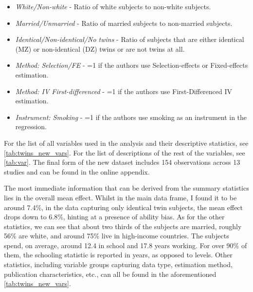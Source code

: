 \begin{itemize}
  \item \textit{White/Non-white} - Ratio of white subjects to non-white subjects.
  \item \textit{Married/Unmarried} - Ratio of married subjects to non-married subjects.
  \item \textit{Identical/Non-identical/No twins} - Ratio of subjects that are either identical (MZ) or non-identical (DZ) twins or are not twins at all.
  \item \textit{Method: Selection/FE} - =1 if the authors use  Selection-effects or Fixed-effects estimation.
  \item \textit{Method: IV First-differenced} - =1 if the authors use First-Differenced IV estimation.
  \item \textit{Instrument: Smoking} - =1 if the authors use smoking as an instrument in the regression.
\end{itemize}


For the list of all variables used in the analysis and their descriptive statistics, see \autoref{tab:twins_new_vars}. For the list of descriptions of the rest of the variables, see \autoref{tab:var}. The final form of the new dataset includes 154 observations across 13 studies and can be found in the online appendix.

The most immediate information that can be derived from the summary statistics lies in the overall mean effect. Whilst in the main data frame, I found it to be around 7.4\%, in the data capturing only identical twin subjects, the mean effect drops down to 6.8\%, hinting at a presence of ability bias. As for the other statistics, we can see that about two thirds of the subjects are married, roughly 56\% are white, and around 75\% live in high-income countries. The subjects spend, on average, around 12.4 in school and 17.8 years working. For over 90\% of them, the schooling statistic is reported in years, as opposed to levels. Other statistics, including variable groups capturing data type, estimation method, publication characteristics, etc., can all be found in the aforementioned \autoref{tab:twins_new_vars}.

